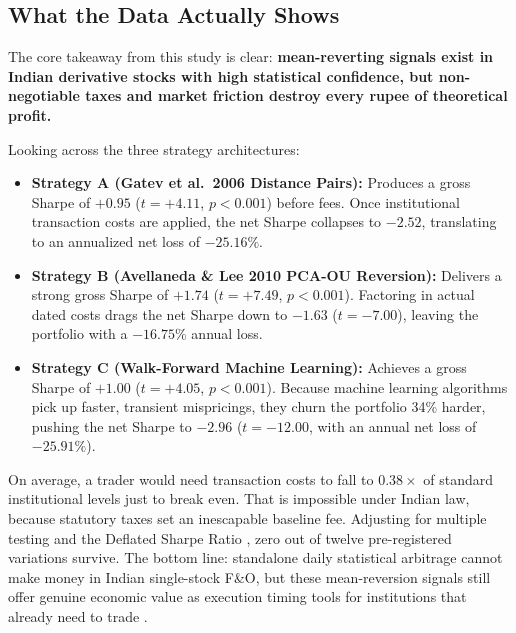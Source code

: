 \subsection{What the Data Actually Shows}
The core takeaway from this study is clear: \textbf{mean-reverting signals exist in Indian derivative stocks with high statistical confidence, but non-negotiable taxes and market friction destroy every rupee of theoretical profit.}

Looking across the three strategy architectures:
\begin{itemize}
    \item \textbf{Strategy A (Gatev et al.\ 2006 Distance Pairs):} Produces a gross Sharpe of $+0.95$ ($t = +4.11$, $p < 0.001$) before fees. Once institutional transaction costs are applied, the net Sharpe collapses to $-2.52$, translating to an annualized net loss of $-25.16\%$.
    \item \textbf{Strategy B (Avellaneda \& Lee 2010 PCA-OU Reversion):} Delivers a strong gross Sharpe of $+1.74$ ($t = +7.49$, $p < 0.001$). Factoring in actual dated costs drags the net Sharpe down to $-1.63$ ($t = -7.00$), leaving the portfolio with a $-16.75\%$ annual loss.
    \item \textbf{Strategy C (Walk-Forward Machine Learning):} Achieves a gross Sharpe of $+1.00$ ($t = +4.05$, $p < 0.001$). Because machine learning algorithms pick up faster, transient mispricings, they churn the portfolio 34\% harder, pushing the net Sharpe to $-2.96$ ($t = -12.00$, with an annual net loss of $-25.91\%$).
\end{itemize}

On average, a trader would need transaction costs to fall to $0.38\times$ of standard institutional levels just to break even. That is impossible under Indian law, because statutory taxes set an inescapable baseline fee. Adjusting for multiple testing and the Deflated Sharpe Ratio \citep{bailey2014deflated,harvey2016and,benjamini1995controlling}, zero out of twelve pre-registered variations survive. The bottom line: standalone daily statistical arbitrage cannot make money in Indian single-stock F\&O, but these mean-reversion signals still offer genuine economic value as execution timing tools for institutions that already need to trade \citep{novymarx2016taxonomy}.


